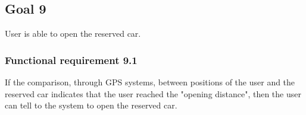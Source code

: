 \subsection{Goal 9}
User is able to open the reserved car.

\setcounter{secnumdepth}{3}
\subsubsection{Functional requirement 9.1}
If the comparison, through GPS systems, between positions of the user and the reserved car indicates that the user reached the "opening distance", then the user can tell to the system to open the reserved car.